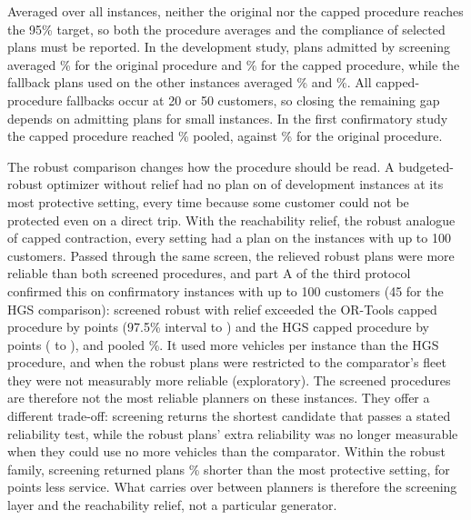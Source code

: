 \documentclass[11pt,a4paper]{article}
\begin{document}
Averaged over all instances, neither the original nor the capped procedure reaches
the 95\% target,
so both the procedure averages and the compliance of selected plans must be
reported. In the
development study, plans admitted by screening averaged \OriginalSelectedMean\%
for the original procedure and \CappedSelectedMean\% for the capped procedure,
while the fallback plans used on the other instances averaged
\OriginalFallbackMean\% and \CappedFallbackMean\%. All \CappedFallbackCount{}
capped-procedure fallbacks occur at 20 or 50 customers, so closing the remaining
gap depends on admitting plans for small instances. In the first confirmatory
study the capped procedure reached \ConfPooledK\% pooled, against \ConfPooledP\%
for the original procedure.

The robust comparison changes how the procedure should be read. A budgeted-robust
optimizer without relief had no plan on \RobNoPlanBoxSix{} of \RobInstances{}
development instances at its most protective setting, every time because some
customer could not be protected even on a direct trip. With the reachability
relief, the robust analogue of capped contraction, every setting had a plan on
the instances with up to 100 customers. Passed through the same screen, the relieved robust plans were more reliable than
both screened procedures, and part A of the third protocol confirmed this on
\PaInstances{} confirmatory instances with up to 100 customers (45 for the HGS
comparison): screened robust with relief exceeded the
OR-Tools capped procedure by \PaROne{} points (97.5\% interval \PaROneLo{} to
\PaROneHi{}) and the HGS capped procedure by \PaRTwo{} points (\PaRTwoLo{} to
\PaRTwoHi{}), and pooled \PaScreenedP\%. It used \PaRThree{} more vehicles per
instance than the HGS procedure, and when the robust plans were restricted to the
comparator's fleet they were not measurably more reliable (exploratory). The
screened procedures are therefore not the most reliable planners on these
instances. They offer a different trade-off: screening returns the shortest
candidate that passes a stated reliability test, while the robust plans' extra
reliability was no longer measurable when they could use no more vehicles than
the comparator. Within the robust family, screening
returned plans \PaRFourAbs\% shorter than the most protective setting, for
\PaBoxMinusScr{} points less service. What carries over between planners is
therefore the screening layer and the reachability relief, not a particular
generator.
\end{document}
